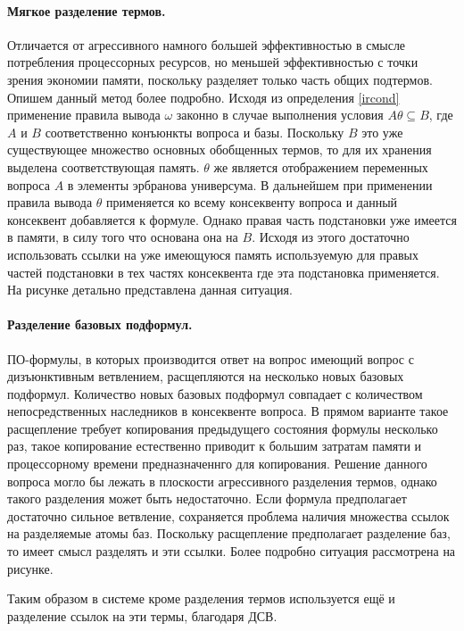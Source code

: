 \paragraph{Мягкое разделение термов.} Отличается от агрессивного намного большей эффективностью в смысле потребления процессорных ресурсов, но меньшей эффективностью с точки зрения экономии памяти, поскольку разделяет только часть общих подтермов. Опишем данный метод более подробно. Исходя из определения \ref{ircond} применение правила вывода $\omega$ законно в случае выполнения условия $A\theta \subseteq B$, где $A$ и $B$ соответственно конъюнкты вопроса и базы. Поскольку $B$ это уже существующее множество основных обобщенных термов, то для их хранения выделена соответствующая память. $\theta$ же является отображением переменных вопроса $A$ в элементы эрбранова универсума. В дальнейшем при применении правила вывода $\theta$ применяется ко всему консеквенту вопроса и данный консеквент добавляется к формуле. Однако правая часть подстановки уже имеется в памяти, в силу того что основана она на $B$. Исходя из этого достаточно использовать ссылки на уже имеющуюся память используемую для правых частей подстановки в тех частях консеквента где эта подстановка применяется. На рисунке детально представлена данная ситуация.

\paragraph{Разделение базовых подформул.} ПО-формулы, в которых производится ответ на вопрос имеющий вопрос с дизъюнктивным ветвлением, расщепляются на несколько новых базовых подформул. Количество новых базовых подформул совпадает с количеством непосредственных наследников в консеквенте вопроса. В прямом варианте такое расщепление требует копирования предыдущего состояния формулы несколько раз, такое копирование естественно приводит к большим затратам памяти и процессорному времени предназначеннго для копирования. Решение данного вопроса могло бы лежать в плоскости агрессивного разделения термов, однако такого разделения может быть недостаточно. Если формула предполагает достаточно сильное ветвление, сохраняется проблема наличия множества ссылок на разделяемые атомы баз. Поскольку расщепление предполагает разделение баз, то имеет смысл разделять и эти ссылки. Более подробно ситуация рассмотрена на рисунке. 

Таким образом в системе кроме разделения термов используется ещё и разделение ссылок на эти термы, благодаря ДСВ.

